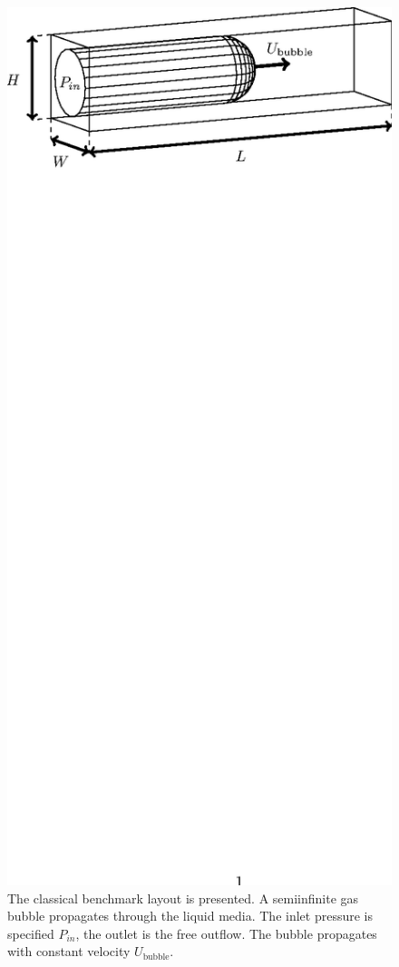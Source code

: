 \documentclass{article}
\begin{document}
\begin{figure}[htb!]
\includegraphics*[bb=153 610 405 717,width=\textwidth]{Figures/benchmark_classical.eps} 
\caption{The classical benchmark layout is presented. A semiinfinite gas bubble
propagates through the liquid media. The inlet pressure is specified $P_{in}$, the outlet is the
free outflow. The bubble propagates with constant velocity $U_{\mathrm{bubble}}$. 
\label{fig:classical:benchmark}}
\end{figure}
\end{document}
